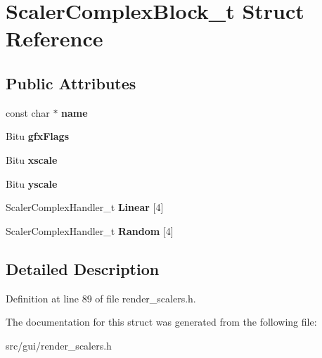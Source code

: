 \hypertarget{structScalerComplexBlock__t}{\section{Scaler\-Complex\-Block\-\_\-t Struct Reference}
\label{structScalerComplexBlock__t}
}
\subsection*{Public Attributes}
\begin{DoxyCompactItemize}
\item 
\hypertarget{structScalerComplexBlock__t_af8c81fab48a4d87ce960686d6625da87}{const char $\ast$ {\bfseries name}}\label{structScalerComplexBlock__t_af8c81fab48a4d87ce960686d6625da87}

\item 
\hypertarget{structScalerComplexBlock__t_a86e085556ec683daec62f5f911ae5284}{Bitu {\bfseries gfx\-Flags}}\label{structScalerComplexBlock__t_a86e085556ec683daec62f5f911ae5284}

\item 
\hypertarget{structScalerComplexBlock__t_a167ae943d3d005007812ebbd9def1e0f}{Bitu {\bfseries xscale}}\label{structScalerComplexBlock__t_a167ae943d3d005007812ebbd9def1e0f}

\item 
\hypertarget{structScalerComplexBlock__t_a0c97b9521ff1cbd39784a5fd8fe4b613}{Bitu {\bfseries yscale}}\label{structScalerComplexBlock__t_a0c97b9521ff1cbd39784a5fd8fe4b613}

\item 
\hypertarget{structScalerComplexBlock__t_a752b0a7f66e14e8878766ced311678c3}{Scaler\-Complex\-Handler\-\_\-t {\bfseries Linear} \mbox{[}4\mbox{]}}\label{structScalerComplexBlock__t_a752b0a7f66e14e8878766ced311678c3}

\item 
\hypertarget{structScalerComplexBlock__t_a96d139ee942cff244bd45d16f6201e90}{Scaler\-Complex\-Handler\-\_\-t {\bfseries Random} \mbox{[}4\mbox{]}}\label{structScalerComplexBlock__t_a96d139ee942cff244bd45d16f6201e90}

\end{DoxyCompactItemize}


\subsection{Detailed Description}


Definition at line 89 of file render\-\_\-scalers.\-h.



The documentation for this struct was generated from the following file\-:\begin{DoxyCompactItemize}
\item 
src/gui/render\-\_\-scalers.\-h\end{DoxyCompactItemize}

